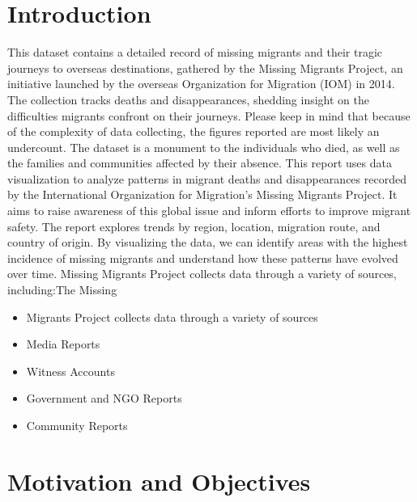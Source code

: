 \documentclass{article}
\begin{document}
\section{Introduction}
This dataset contains a detailed record of missing migrants and their tragic journeys to overseas destinations, gathered by the Missing Migrants Project, an initiative launched by the overseas Organization for Migration (IOM) in 2014. The collection tracks deaths and disappearances, shedding insight on the difficulties migrants confront on their journeys. Please keep in mind that because of the complexity of data collecting, the figures reported are most likely an undercount. The dataset is a monument to the individuals who died, as well as the families and communities affected by their absence.
This report uses data visualization to analyze patterns in migrant deaths and disappearances recorded by the International Organization for Migration's Missing Migrants Project. It aims to raise awareness of this global issue and inform efforts to improve migrant safety. The report explores trends by region, location, migration route, and country of origin. By visualizing the data, we can identify areas with the highest incidence of missing migrants and understand how these patterns have evolved over time.
Missing Migrants Project collects data through a variety of sources, including:The Missing 

\begin{itemize}
    \item  Migrants Project collects data through a variety of sources
    \item  Media Reports
    \item  Witness Accounts
    \item  Government and NGO Reports
    \item Community Reports
\end{itemize}


\section{Motivation and Objectives}
\end{document}
